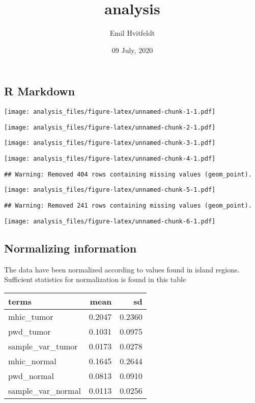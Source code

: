 \documentclass[
]{article}
\title{analysis}
\author{Emil Hvitfeldt}
\date{09 July, 2020}
\begin{document}
\maketitle

\hypertarget{r-markdown}{%
\subsection{R Markdown}\label{r-markdown}}

\texttt{[image: analysis\_files/figure-latex/unnamed-chunk-1-1.pdf]}

\texttt{[image: analysis\_files/figure-latex/unnamed-chunk-2-1.pdf]}

\texttt{[image: analysis\_files/figure-latex/unnamed-chunk-3-1.pdf]}

\texttt{[image: analysis\_files/figure-latex/unnamed-chunk-4-1.pdf]}

\begin{verbatim}
## Warning: Removed 404 rows containing missing values (geom_point).
\end{verbatim}

\texttt{[image: analysis\_files/figure-latex/unnamed-chunk-5-1.pdf]}

\begin{verbatim}
## Warning: Removed 241 rows containing missing values (geom_point).
\end{verbatim}

\texttt{[image: analysis\_files/figure-latex/unnamed-chunk-6-1.pdf]}

\hypertarget{normalizing-information}{%
\subsection{Normalizing information}\label{normalizing-information}}

The data have been normalized according to values found in island
regions. Sufficient statistics for normalization is found in this table

\begin{longtable}[]{@{}lrr@{}}
\toprule
terms & mean & sd\tabularnewline
\midrule
\endhead
mhic\_tumor & 0.2047 & 0.2360\tabularnewline
pwd\_tumor & 0.1031 & 0.0975\tabularnewline
sample\_var\_tumor & 0.0173 & 0.0278\tabularnewline
mhic\_normal & 0.1645 & 0.2644\tabularnewline
pwd\_normal & 0.0813 & 0.0910\tabularnewline
sample\_var\_normal & 0.0113 & 0.0256\tabularnewline
\bottomrule
\end{longtable}
\end{document}
